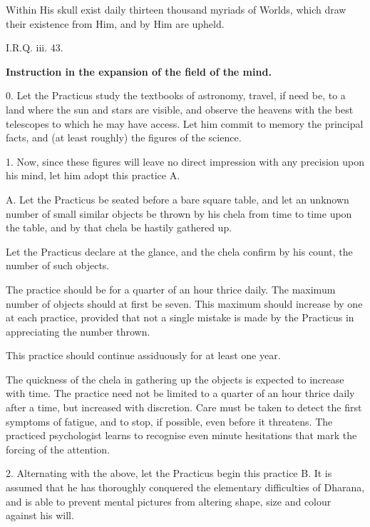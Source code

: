 
\epigraph{Within His skull exist daily thirteen thousand myriads of Worlds, which draw their existence from Him, and by Him are upheld.}{I.R.Q. iii. 43.}

\textbf{Instruction in the expansion of the field of the mind.}


0. Let the Practicus study the textbooks of astronomy, travel, if need be, to a land where the sun and stars are visible, and observe the heavens with the best telescopes to which he may have access. Let him commit to memory the principal facts, and (at least roughly) the figures of the science.

1. Now, since these figures will leave no direct impression with any precision upon his mind, let him adopt this practice A.


\begin{quoting}

A. Let the Practicus be seated before a bare square table, and let an unknown number of small similar objects be thrown by his chela from time to time upon the table, and by that chela be hastily gathered up.

Let the Practicus declare at the glance, and the chela confirm by his count, the number of such objects.

The practice should be for a quarter of an hour thrice daily. The maximum number of objects should at first be seven. This maximum should increase by one at each practice, provided that not a single mistake is made by the Practicus in appreciating the number thrown.

This practice should continue assiduously for at least one year.

The quickness of the chela in gathering up the objects is expected to increase with time. The practice need not be limited to a quarter of an hour thrice daily after a time, but increased with discretion. Care must be taken to detect the first symptoms of fatigue, and to stop, if possible, even before it threatens. The practiced psychologist learns to recognise even minute hesitations that mark the forcing of the attention.

\end{quoting}


2. Alternating with the above, let the Practicus begin this practice B. It is assumed that he has thoroughly conquered the elementary difficulties of Dharana, and is able to prevent mental pictures from altering shape, size and colour against his will.


